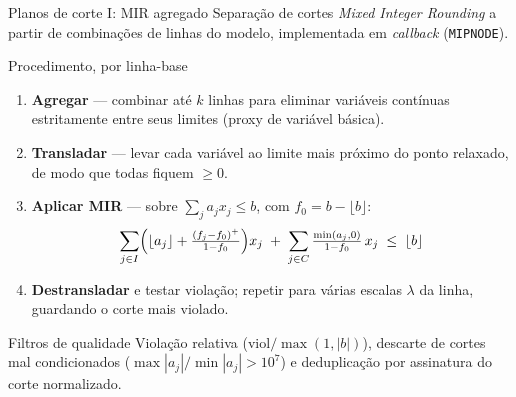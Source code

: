 \documentclass[10pt,aspectratio=169]{beamer}
\begin{document}
\begin{frame}{Planos de corte I: MIR agregado}
  \small
  Separação de cortes \emph{Mixed Integer Rounding} a partir de combinações
  de linhas do modelo, implementada em \emph{callback} (\texttt{MIPNODE}).

  \vspace{0.4em}
  \begin{block}{Procedimento, por linha-base}
    \footnotesize
    \begin{enumerate}\itemsep2pt
      \item \textbf{Agregar} --- combinar até $k$ linhas para eliminar variáveis
            contínuas estritamente entre seus limites (proxy de variável básica).
      \item \textbf{Transladar} --- levar cada variável ao limite mais próximo
            do ponto relaxado, de modo que todas fiquem $\ge 0$.
      \item \textbf{Aplicar MIR} --- sobre $\sum_j a_j x_j \le b$, com
            $f_0 = b - \lfloor b \rfloor$:
            \[
              \sum_{j \in I} \Bigl(\lfloor a_j \rfloor
                + \tfrac{(f_j - f_0)^+}{1 - f_0}\Bigr) x_j
              \;+\; \sum_{j \in C} \tfrac{\min(a_j,0)}{1-f_0}\, x_j
              \;\le\; \lfloor b \rfloor
            \]
      \item \textbf{Destransladar} e testar violação; repetir para várias
            escalas $\lambda$ da linha, guardando o corte mais violado.
    \end{enumerate}
  \end{block}

  \begin{block}{Filtros de qualidade}
    \footnotesize
    Violação \alert{relativa} ($\text{viol}/\max(1,|b|)$), descarte de cortes
    mal condicionados ($\max|a_j| / \min|a_j| > 10^7$) e \alert{deduplicação}
    por assinatura do corte normalizado.
  \end{block}
\end{frame}
\end{document}
